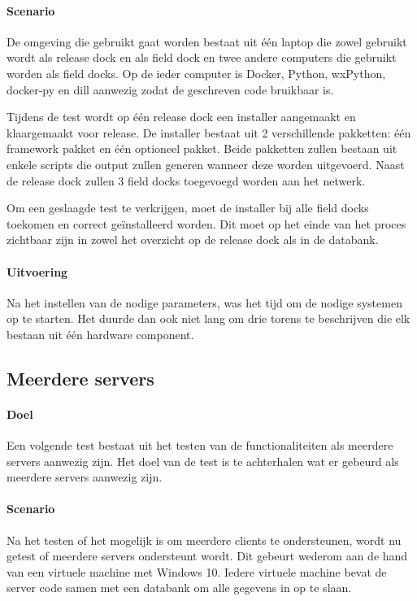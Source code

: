 \paragraph{Scenario}
De omgeving die gebruikt gaat worden bestaat uit één laptop die zowel gebruikt wordt als release dock en als field dock en twee andere computers die gebruikt worden als field docks.
Op de ieder computer is Docker, Python, wxPython, docker-py en dill aanwezig zodat de geschreven code bruikbaar is.

Tijdens de test wordt op één release dock een installer aangemaakt en klaargemaakt voor release.
De installer bestaat uit 2 verschillende pakketten: één framework pakket en één optioneel pakket.
Beide pakketten zullen bestaan uit enkele scripts die output zullen generen wanneer deze worden uitgevoerd.
Naast de release dock zullen 3 field docks toegevoegd worden aan het netwerk.

Om een geslaagde test te verkrijgen, moet de installer bij alle field docks toekomen en correct geïnstalleerd worden.
Dit moet op het einde van het proces zichtbaar zijn in zowel het overzicht op de release dock als in de databank.

\paragraph{Uitvoering}
Na het instellen van de nodige parameters, was het tijd om de nodige systemen op te starten.
Het duurde dan ook niet lang om drie torens te beschrijven die elk bestaan uit één hardware component.


\subsection{Meerdere servers}
\paragraph{Doel}
Een volgende test bestaat uit het testen van de functionaliteiten als meerdere servers aanwezig zijn.
Het doel van de test is te achterhalen wat er gebeurd als meerdere servers aanwezig zijn.

\paragraph{Scenario}
Na het testen of het mogelijk is om meerdere clients te ondersteunen, wordt nu getest of meerdere servers ondersteunt wordt.
Dit gebeurt wederom aan de hand van een virtuele machine met Windows 10.
Iedere virtuele machine bevat de server code samen met een databank om alle gegevens in op te slaan.

